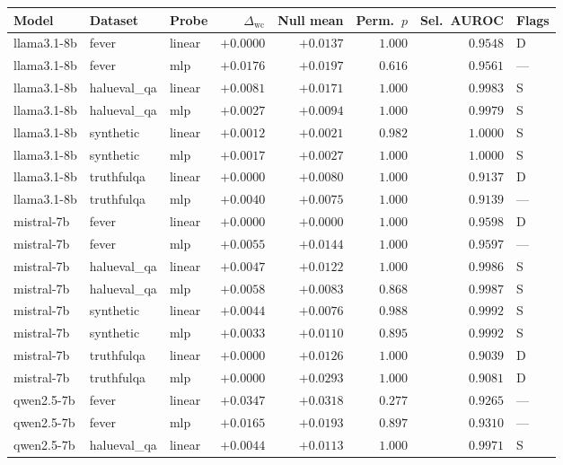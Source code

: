 \documentclass[10pt]{article} %
\begin{document}
\begin{table}[h]
\centering
\small
\begin{tabular}{lllrrrrl}
\toprule
Model & Dataset & Probe & $\Delta_{\text{wc}}$ & Null mean & Perm.\ $p$ & Sel.\ AUROC & Flags \\
\midrule
llama3.1-8b & fever & linear & $+0.0000$ & $+0.0137$ & $1.000$ & $0.9548$ & D \\
llama3.1-8b & fever & mlp & $+0.0176$ & $+0.0197$ & $0.616$ & $0.9561$ & --- \\
llama3.1-8b & halueval\_qa & linear & $+0.0081$ & $+0.0171$ & $1.000$ & $0.9983$ & S \\
llama3.1-8b & halueval\_qa & mlp & $+0.0027$ & $+0.0094$ & $1.000$ & $0.9979$ & S \\
llama3.1-8b & synthetic & linear & $+0.0012$ & $+0.0021$ & $0.982$ & $1.0000$ & S \\
llama3.1-8b & synthetic & mlp & $+0.0017$ & $+0.0027$ & $1.000$ & $1.0000$ & S \\
llama3.1-8b & truthfulqa & linear & $+0.0000$ & $+0.0080$ & $1.000$ & $0.9137$ & D \\
llama3.1-8b & truthfulqa & mlp & $+0.0040$ & $+0.0075$ & $1.000$ & $0.9139$ & --- \\
mistral-7b & fever & linear & $+0.0000$ & $+0.0000$ & $1.000$ & $0.9598$ & D \\
mistral-7b & fever & mlp & $+0.0055$ & $+0.0144$ & $1.000$ & $0.9597$ & --- \\
mistral-7b & halueval\_qa & linear & $+0.0047$ & $+0.0122$ & $1.000$ & $0.9986$ & S \\
mistral-7b & halueval\_qa & mlp & $+0.0058$ & $+0.0083$ & $0.868$ & $0.9987$ & S \\
mistral-7b & synthetic & linear & $+0.0044$ & $+0.0076$ & $0.988$ & $0.9992$ & S \\
mistral-7b & synthetic & mlp & $+0.0033$ & $+0.0110$ & $0.895$ & $0.9992$ & S \\
mistral-7b & truthfulqa & linear & $+0.0000$ & $+0.0126$ & $1.000$ & $0.9039$ & D \\
mistral-7b & truthfulqa & mlp & $+0.0000$ & $+0.0293$ & $1.000$ & $0.9081$ & D \\
qwen2.5-7b & fever & linear & $+0.0347$ & $+0.0318$ & $0.277$ & $0.9265$ & --- \\
qwen2.5-7b & fever & mlp & $+0.0165$ & $+0.0193$ & $0.897$ & $0.9310$ & --- \\
qwen2.5-7b & halueval\_qa & linear & $+0.0044$ & $+0.0113$ & $1.000$ & $0.9971$ & S \\

\end{tabular}
\end{table}
\end{document}
